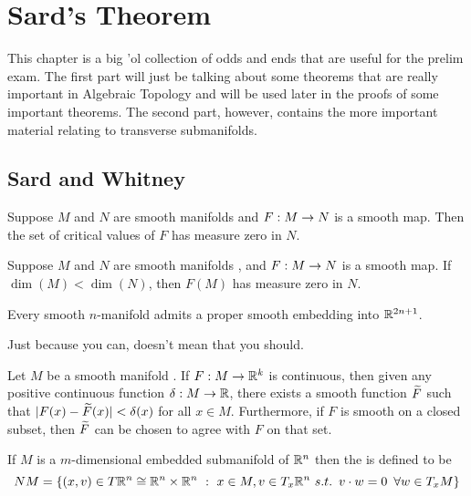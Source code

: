 \newpage\setcounter{section}{5}
\section{Sard's Theorem}

This chapter is a big 'ol collection of odds and ends that are useful for the prelim exam. The first part will just be talking about some theorems that are really important in Algebraic Topology and will be used later in the proofs of some important theorems. The second part, however, contains the more important material relating to transverse submanifolds.

\subsection{Sard and Whitney}

\setcounter{thm}{9}

\begin{thm}
Suppose $M$ and $N$ are smooth manifolds \wowob and $F:M\rightarrow N$ is a smooth map. Then the set of critical values of $F$ has measure zero in $N$.
\end{thm}

\begin{cor}
Suppose $M$ and $N$ are smooth manifolds \wowob, and $F:M\rightarrow N$ is a smooth map. If $\dim(M) < \dim(N)$, then $F(M)$ has measure zero in $N$.
\end{cor}

\begin{thm}
Every smooth $n$-manifold \wowob admits a proper smooth embedding into $\mathbb{R}^{2n + 1}$.
\end{thm}

\nb Just because you can, doesn't mean that you should.

\setcounter{thm}{20}

\begin{thm}
Let $M$ be a smooth manifold \wowob. If $F:M\rightarrow \mathbb{R}^k$ is continuous, then given any positive continuous function $\delta:M\rightarrow \mathbb{R}$, there exists a smooth function $\widetilde F$ such that $|F(x) - \widetilde F(x)|< \delta(x)$ for all $x\in M$. Furthermore, if $F$ is smooth on a closed subset, then $\widetilde F$ can be chosen to agree with $F$ on that set.
\end{thm}

\dfn If $M$ is a $m$-dimensional embedded submanifold of $\mathbb{R}^n$ then the  is defined to be 
\[NM = \{(x,v)\in T\mathbb{R}^n\cong \mathbb{R}^n\times\mathbb{R}^n\ :\ x\in M,v\in T_x\mathbb{R}^n\ s.t.\,\,\, v\cdot w = 0 \,\,\,\forall w\in T_xM\}\]

